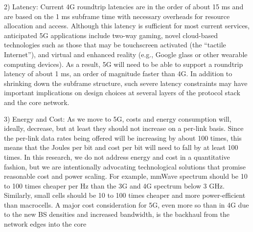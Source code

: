 \begin{flushleft}2) Latency: Current 4G roundtrip latencies are in the order of about 15 ms and are based on the 1 ms subframe time with necessary overheads for resource allocation and access. Although this latency is sufficient for most current services, anticipated 5G applications include two-way gaming, novel cloud-based technologies such as those that may be touchscreen activated (the “tactile Internet”), and virtual and enhanced reality (e.g., Google glass or other wearable computing devices). As a result, 5G will need to be able to support a roundtrip latency of about 1 ms, an order of magnitude faster than 4G. In addition to shrinking down the subframe structure, such severe latency constraints may have important implications on design choices at several layers of the protocol stack and the core network.\end{flushleft}
\begin{flushleft}3) Energy and Cost: As we move to 5G, costs and energy consumption will, ideally, decrease, but at least they should not increase on a per-link basis. Since the per-link data rates being offered will be increasing by about 100 times, this means that the Joules per bit and cost per bit will need to fall by at least 100 times. In this research, we do not address energy and cost in a quantitative fashion, but we are intentionally advocating technological solutions that promise reasonable cost and power scaling. For example, mmWave spectrum should be 10 to 100 times cheaper per Hz than the 3G and 4G spectrum below 3 GHz. Similarly, small cells should be 10 to 100 times cheaper and more power-efficient than macrocells. A major cost consideration for 5G, even more so than in 4G due to the new BS densities and increased bandwidth, is the backhaul from the network edges into the core\end{flushleft}




